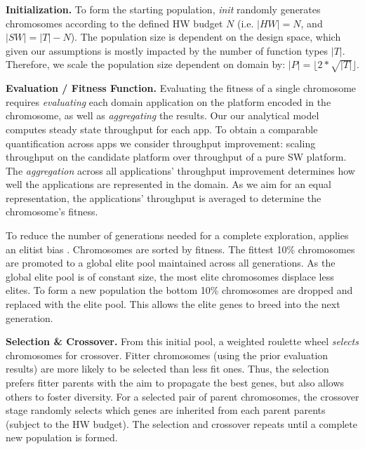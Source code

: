 \textbf{Initialization.} To form the starting population, \emph{init} randomly generates chromosomes according to the defined HW budget $N$ (i.e. $\lvert HW \rvert = N$, and $\lvert SW \rvert = \lvert T \rvert - N$). The population size is dependent on the design space, which given our assumptions is mostly impacted by the number of function types $\lvert T \rvert$. Therefore, we scale the population size dependent on domain by: $\lvert P  \rvert = \lfloor 2 * \sqrt{ \lvert T \rvert} \rfloor$.

\textbf{Evaluation / Fitness Function.} Evaluating the fitness of a single chromosome requires \emph{evaluating} each domain application on the platform encoded in the chromosome, as well as \emph{aggregating} the results. Our our analytical model  computes steady state throughput for each app. To obtain a comparable quantification across apps we consider throughput improvement: scaling throughput on the candidate platform over throughput of a pure SW platform.  The \emph{aggregation} across all applications' throughput improvement determines how well the applications are represented in the domain. As we aim for an equal representation, the applications' throughput is averaged to determine the chromosome's fitness. 

To reduce the number of generations needed for a complete exploration, \ga applies an elitist bias \cite{quan2014towards}. Chromosomes are sorted by fitness. The fittest 10\% chromosomes are promoted to a global elite pool maintained across all generations. As the global elite pool is of constant size, the most elite chromosomes displace less elites. To form a new population the bottom 10\% chromosomes are dropped and replaced with the elite pool. This allows the elite genes to breed into the next generation. 



\textbf{Selection \& Crossover.}
From this initial pool, a weighted roulette wheel \emph{selects} chromosomes for crossover. Fitter chromosomes (using the prior evaluation results) are more likely to be selected than less fit ones. Thus, the selection prefers fitter parents with the aim to propagate the best genes, but also allows others to foster diversity. For a selected pair of parent chromosomes, the crossover stage randomly selects which genes are inherited from each parent parents (subject to the HW budget). The selection and crossover repeats until a complete new population is formed.

